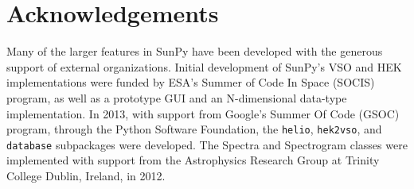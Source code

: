 \section{Acknowledgements}
Many of the larger features in SunPy have been developed with the generous support of 
external organizations. 
Initial development of SunPy's VSO and HEK implementations were funded by ESA's 
Summer of Code In Space (SOCIS) program, as well as a prototype GUI and an
N-dimensional data-type implementation. In 2013, with support from Google's 
Summer Of Code (GSOC) program, through the Python Software Foundation, the 
\texttt{helio}, \texttt{hek2vso}, and \texttt{database} subpackages were 
developed. The Spectra and Spectrogram classes were implemented with support 
from the Astrophysics Research Group at Trinity College Dublin, Ireland, in 
2012.